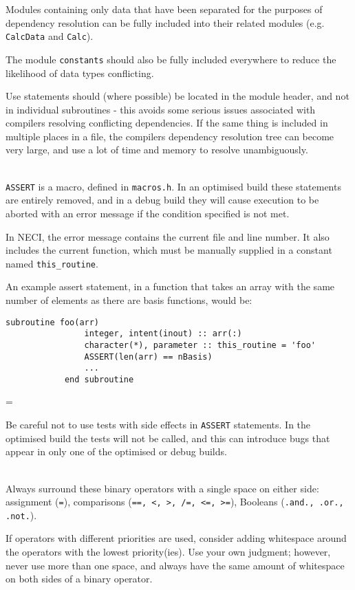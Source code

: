 \documentclass[a4paper,notitlepage]{scrreprt}
\newcommand\headitem[1]{\needspace{1.5\baselineskip}\item[{\boldmath #1 \nopagebreak}] \hfill \\ \nopagebreak}
\let\code\lstinline
\newenvironment{warningbox}
	{\par\begin{mdframed}[%
		linewidth = 2pt, %
	    linecolor = red, %
	    roundcorner = 6pt, %
		backgroundcolor = gray!20
	]\begin{list}{}{\leftmargin=1cm
			           \labelwidth=\leftmargin}\item[\Large\ding{43}]}
	{\end{list}\end{mdframed}\par}
\begin{document}
\begin{description}
		Modules containing only data that have been separated for the purposes
		of dependency resolution can be fully included into their related
		modules (e.g. \code{CalcData} and \code{Calc}).

		The module \code{constants} should also be fully included
		everywhere to reduce the likelihood of data types conflicting.

		Use statements should
		(where possible) be located in the module header, and not in
		individual subroutines - this avoids some serious issues associated
		with compilers resolving conflicting dependencies. If the same thing
		is included in multiple places in a file, the compilers dependency
		resolution tree can become very large, and use a lot of time and
		memory to resolve unambiguously.


	\headitem{{\ttfamily ASSERT} statements}
		\code{ASSERT} is a macro, defined in \code{macros.h}. In
		an optimised build these statements are entirely removed, and in a
		debug build they will cause execution to be aborted with an error
		message if the condition specified is not met.

		In NECI, the error message contains the current file and line number.
		It also includes the current function, which must be manually supplied
		in a constant named \code{this_routine}.

		An example assert statement, in a function that takes an array with
		the same number of elements as there are basis functions, would be:
		\begin{lstlisting}[gobble=8]
			subroutine foo(arr)
				integer, intent(inout) :: arr(:)
				character(*), parameter :: this_routine = 'foo'
				ASSERT(len(arr) == nBasis)
				...
			end subroutine
		\end{lstlisting}

		\begin{warningbox}
			Be careful not to use tests with side effects in \code{ASSERT}
			statements. In the optimised build the tests will not be called,
			and this can introduce bugs that appear in only one of the
			optimised or debug builds.
		\end{warningbox}

    \headitem{Operator Layout}
        Always surround these binary operators with a single space on either side:
        assignment (\code{=}), comparisons (\code{==, <, >, /=, <=, >=}),
        Booleans (\code{.and., .or., .not.}).

        If operators with different priorities are used, consider adding
        whitespace around the operators with the lowest priority(ies).
        Use your own judgment; however, never use more than one space,
        and always have the same amount of whitespace on both sides
        of a binary operator.


\end{description}
\end{document}
